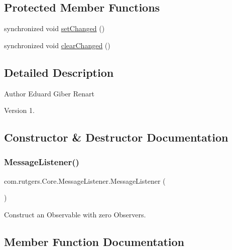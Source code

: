 \subsection*{Protected Member Functions}
\begin{DoxyCompactItemize}
\item 
synchronized void \hyperlink{classcom_1_1rutgers_1_1Core_1_1MessageListener_a98f9b666ae0b37f818ae53024a10ddad}{set\+Changed} ()
\item 
synchronized void \hyperlink{classcom_1_1rutgers_1_1Core_1_1MessageListener_ad677331c0373ba3a7907119a35ce3a8f}{clear\+Changed} ()
\end{DoxyCompactItemize}


\subsection{Detailed Description}
\begin{DoxyAuthor}{Author}
Eduard Giber Renart 
\end{DoxyAuthor}
\begin{DoxyVersion}{Version}
1. 
\end{DoxyVersion}


\subsection{Constructor \& Destructor Documentation}
\mbox{\label{classcom_1_1rutgers_1_1Core_1_1MessageListener_a62c2c226668ee66cb62b0f9c0070fe17}} 
\subsubsection{\texorpdfstring{Message\+Listener()}{MessageListener()}}
{\footnotesize\ttfamily com.\+rutgers.\+Core.\+Message\+Listener.\+Message\+Listener (\begin{DoxyParamCaption}{ }\end{DoxyParamCaption})}

Construct an Observable with zero Observers. 

\subsection{Member Function Documentation}
\mbox{\label{classcom_1_1rutgers_1_1Core_1_1MessageListener_a36123785cf1a468272d74d7a394779eb}} 
